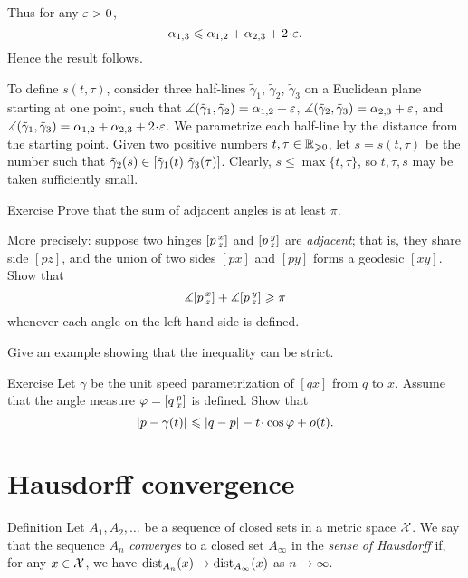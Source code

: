 Thus for any $\varepsilon>0$, 
\[\alpha_{1,3}\le \alpha_{1,2}+\alpha_{2,3}+2\cdot \eps.\]
Hence the result follows.

To define $s(t,\tau)$, consider three half-lines $\tilde \gamma_1$, $\tilde \gamma_2$, $\tilde \gamma_3$ on a Euclidean plane starting at one point, such that
$\measuredangle(\tilde \gamma_1,\tilde \gamma_2)=\alpha_{1,2}+\varepsilon$,
$\measuredangle(\tilde \gamma_2,\tilde \gamma_3)=\alpha_{2,3}+\varepsilon$,
and $\mangle(\tilde \gamma_1,\tilde \gamma_3)\z=\alpha_{1,2}\z+\alpha_{2,3}\z+2\cdot \eps$.
We parametrize each half-line by the distance from the starting point.
Given two positive numbers $t,\tau\in\mathbb{R}_{\geqslant0}$, let $s=s(t,\tau)$ be 
the number such that 
$\tilde \gamma_2(s)\in[\tilde \gamma_1(t)\ \tilde \gamma_3(\tau)]$. 
Clearly, $s\le\max\{t,\tau\}$, so $t,\tau,s$ may be taken sufficiently small.
\qeds 

\begin{thm}{Exercise}\label{ex:adjacent-angles}
Prove that the sum of adjacent angles is at least $\pi$.

More precisely: suppose two hinges $[p\,{}^{x}_{z}]$ and $[p\,{}^{y}_{z}]$ are \emph{adjacent};
that is, they share side $[pz]$, and the union of two sides $[px]$ and $[py]$ forms a geodesic $[xy]$.
Show that
\[\measuredangle[p\,{}^{x}_{z}]+\measuredangle[p\,{}^{y}_{z}]\geqslant \pi\]
whenever  each angle on the left-hand side is defined.

Give an example showing that the inequality can be strict.
\end{thm}

\begin{thm}{Exercise}\label{ex:first-var}
Let $\gamma$ be the unit speed parametrization of $[qx]$ from $q$ to $x$.
Assume that the angle measure $\varphi=[q\,{}^{p}_{x}]$ is defined.
Show that
\[\dist{p}{\gamma(t)}{}
\le
\dist{q}{p}{}-t\cdot \cos\phi+o(t).\]

\end{thm}

\section{Hausdorff convergence}\label{sec:Hausdorff convergence}

\begin{thm}{Definition}\label{def:gen-Haus-conv}
Let $A_1,A_2,\dots$ be a sequence of closed sets in a metric space $\mathcal{X}$.
We say that the sequence $A_n$ \emph{converges} to a closed set $A_\infty$ in the {}\emph{sense of Hausdorff} if, for any $x\in\mathcal{X}$, we have
$\mathrm{dist}_{A_n}(x)\to \mathrm{dist}_{A_\infty}(x)$ as $n\to\infty$.
\end{thm}

